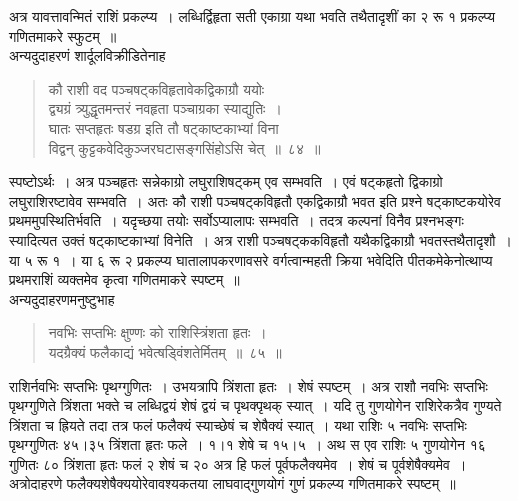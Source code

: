 \documentclass[11pt, openany]{book}
\begin{document}
अत्र यावत्तावन्मितं राशिं प्रकल्प्य~। लब्धिर्द्विहृता सती एकाग्रा यथा 
भवति तथैतादृशीं का २ रू १ प्रकल्प्य गणितमाकरे स्फुटम्~॥ \\

\vspace{-3mm}
 अन्यदुदाहरणं शार्दूलविक्रीडितेनाह\textendash 
\begin{quote}
    \ex
     कौ राशी वद पञ्चषट्कविहृतावेकद्विकाग्रौ ययोः \\
 द्व्यग्रं त्र्युद्धृतमन्तरं नवहृता पञ्चाग्रका स्याद्युतिः~। \\
 घातः सप्तहृतः षडग्र इति तौ षट्काष्टकाभ्यां विना \\
 विद्वन् कुट्टकवेदिकुञ्जरघटासङ्गसिंहोऽसि चेत्~॥~८४~॥~
\end{quote}

स्पष्टोऽर्थः~। अत्र पञ्चहृतः सन्नेकाग्रो लघुराशिषट्कम् एव सम्भवति~। 
एवं षट्कहृतो द्विकाग्रो लघुराशिरष्टावेव सम्भवति~। अतः कौ 
राशी पञ्चषट्कविहृतौ एकद्विकाग्रौ भवत इति प्रश्ने षट्काष्टकयोरेव
\newpage%
\noindent प्रथममुपस्थितिर्भवति~। यदृच्छया तयोः सर्वोऽप्यालापः सम्भवति~। तदत्र कल्पनां विनैव प्रश्नभङ्गः स्यादित्यत उक्तं षट्काष्टकाभ्यां विनेति~। अत्र
राशी पञ्चषट्ककविहृतौ यथैकद्विकाग्रौ भवतस्तथैतादृशौ~। या ५ रू १~। या ६ 
रू २ प्रकल्प्य घातालापकरणावसरे वर्गत्वान्महती क्रिया भवेदिति 
पीतकमेकेनोत्थाप्य प्रथमराशिं व्यक्तमेव कृत्वा गणितमाकरे स्पष्टम्~॥ \\

\vspace{-3mm}
 अन्यदुदाहरणमनुष्टुभाह\textendash
\begin{quote}
    \ex
    नवभिः सप्तभिः क्षुण्णः को राशिस्त्रिंशता हृतः~। \\
 यदग्रैक्यं फलैकाद्यं भवेत्षड्विंशतेर्मितम्~॥~८५~॥~
\end{quote}

राशिर्नवभिः सप्तभिः पृथग्गुणितः~। उभयत्रापि त्रिंशता हृतः~। शेषं 
स्पष्टम्~। अत्र राशौ नवभिः सप्तभिः पृथग्गुणिते त्रिंशता भक्ते च 
लब्धिद्वयं शेषं द्वयं च पृथक्पृथक् स्यात्~। यदि तु गुणयोगेन 
राशिरेकत्रैव गुण्यते त्रिंशता च ह्रियते तदा तत्र फलं फलैक्यं स्याच्छेषं
च शेषैक्यं स्यात्~। यथा राशिः ५ नवभिः सप्तभिः पृथग्गुणितः ४५।३५ 
त्रिंशता हृतः फले~। १।१ शेषे च १५।५~। अथ स एव राशिः ५ 
गुणयोगेन १६ गुणितः ८० त्रिंशता हृतः फलं २ शेषं च २० अत्र हि फलं पूर्वफलैक्यमेव~। शेषं च पूर्वशेषैक्यमेव~। अत्रोदाहरणे फलैक्यशेषैक्ययोरेवावश्यकतया लाघवाद्गुणयोगं गुणं प्रकल्प्य गणितमाकरे स्पष्टम्~॥\\
\end{document}
